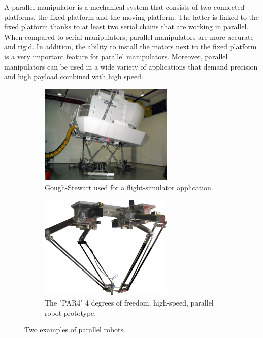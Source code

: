 \documentclass{thesisreport}
\begin{document}
A parallel manipulator is a mechanical system that consists of two connected platforms, the fixed platform and the moving platform. The latter is linked to the fixed platform thanks to at least two serial chains that are working in parallel. When compared to serial manipulators, parallel manipulators are more accurate and rigid. In addition, the ability to install the motors next to the fixed platform is a very important feature for parallel manipulators. Moreover, parallel manipulators can be used in a wide variety of applications that demand precision and high payload combined with high speed.\cite{Parallel_Manipulators}

\begin{figure}[h]
     \centering
     \begin{subfigure}[h]{0.45\textwidth}
         \centering
         \includegraphics[width=0.7\textwidth]{Images/Introduction/GS}
    \caption[Caption for LOF]{Gough-Stewart used for a flight-simulator application.\protect\footnotemark}
         \label{GS}
     \end{subfigure}
     \hfill
     \begin{subfigure}[h]{0.45\textwidth}
         \centering
         \includegraphics[width=0.7\textwidth]{Images/Introduction/PAR4}
         \caption[Caption for LOF]{The "PAR4" 4 degrees of freedom, high-speed, parallel robot prototype.\protect\footnotemark}
         \label{PAR4}
     \end{subfigure}
        \caption{Two examples of parallel robots.}
        \label{fig:three graphs}
\end{figure}
\end{document}
